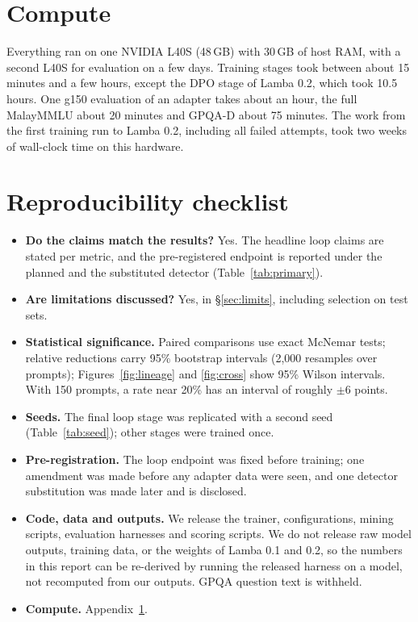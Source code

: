 \documentclass[11pt]{article}
\begin{document}
\section{Compute}
\label{app:compute}

Everything ran on one NVIDIA L40S (48\,GB) with 30\,GB of host RAM, with a second L40S for evaluation on a few days. Training stages took between about 15 minutes and a few hours, except the DPO stage of Lamba 0.2, which took 10.5 hours. One g150 evaluation of an adapter takes about an hour, the full MalayMMLU about 20 minutes and GPQA-D about 75 minutes. The work from the first training run to Lamba 0.2, including all failed attempts, took two weeks of wall-clock time on this hardware.

\section{Reproducibility checklist}

\begin{itemize}
  \item \textbf{Do the claims match the results?} Yes. The headline loop claims are stated per metric, and the pre-registered endpoint is reported under the planned and the substituted detector (Table~\ref{tab:primary}).
  \item \textbf{Are limitations discussed?} Yes, in \S\ref{sec:limits}, including selection on test sets.
  \item \textbf{Statistical significance.} Paired comparisons use exact McNemar tests; relative reductions carry 95\% bootstrap intervals (2,000 resamples over prompts); Figures~\ref{fig:lineage} and \ref{fig:cross} show 95\% Wilson intervals. With 150 prompts, a rate near 20\% has an interval of roughly $\pm$6 points.
  \item \textbf{Seeds.} The final loop stage was replicated with a second seed (Table~\ref{tab:seed}); other stages were trained once.
  \item \textbf{Pre-registration.} The loop endpoint was fixed before training; one amendment was made before any adapter data were seen, and one detector substitution was made later and is disclosed.
  \item \textbf{Code, data and outputs.} We release the trainer, configurations, mining scripts, evaluation harnesses and scoring scripts. We do not release raw model outputs, training data, or the weights of Lamba 0.1 and 0.2, so the numbers in this report can be re-derived by running the released harness on a model, not recomputed from our outputs. GPQA question text is withheld.
  \item \textbf{Compute.} Appendix~\ref{app:compute}.
\end{itemize}
\end{document}
